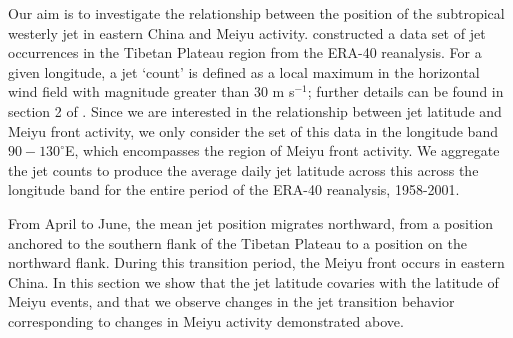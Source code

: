 \documentclass[draft,grl]{AGUTeX}
\begin{document}
\begin{article}
Our aim is to investigate the relationship between the position of the subtropical westerly jet in eastern China and Meiyu activity. \citep{Schiemann2009} constructed a data set of jet occurrences in the Tibetan Plateau region from the ERA-40 reanalysis.  For a given longitude, a jet `count'  is defined as a local maximum in the horizontal wind field with magnitude greater than $30$ m s$^{-1}$; further details can be found in section 2 of \citep{Schiemann2009}. Since we are interested in the relationship between jet latitude and Meiyu front activity, we only consider the set of this data in the longitude band $90-130^\circ$E, which encompasses the region of Meiyu front activity. We aggregate the jet counts to produce the average daily jet latitude across this across the longitude band for the entire period of the ERA-40 reanalysis, 1958-2001. 

	


From April to June, the mean jet position migrates northward, from a position anchored to the southern flank of the Tibetan Plateau to a position on the northward flank. During this transition period, the Meiyu front occurs in eastern China. In this section we show that the jet latitude covaries with the latitude of Meiyu events, and that we observe changes in the jet transition behavior corresponding to changes in Meiyu activity demonstrated above. 


\end{article}
\end{document}
